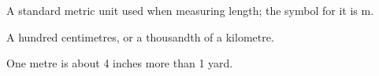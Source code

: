 A standard metric unit used when measuring length; the symbol for it is m.
\par
A hundred centimetres, or a thousandth of a kilometre.
\par
One metre is about 4 inches more than 1 yard.